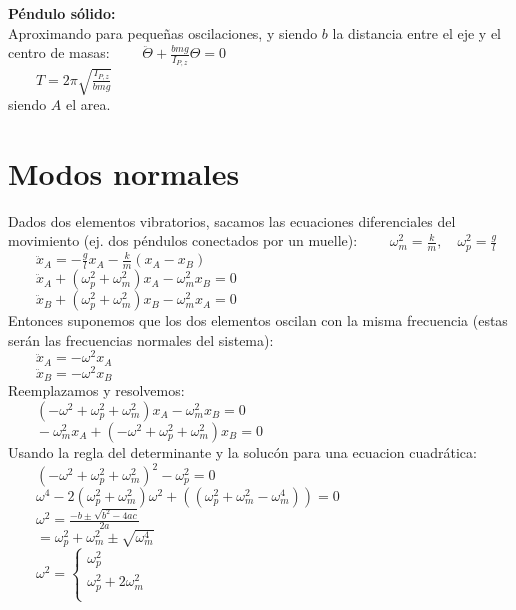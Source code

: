 \documentclass[a4paper,landscape,10pt]{cheatsheet}
\begin{document}
\textbf{Péndulo sólido:}\\
Aproximando para pequeñas oscilaciones, y siendo $b$ la distancia entre el eje y el centro de masas:
$\qquad \ddot{\Theta} + \frac{bmg}{I_{P,z}}\Theta = 0$\\
$\qquad T=2\pi\sqrt{\frac{I_{P,z}}{bmg}}$\\
siendo $A$ el area.


\section{Modos normales}
Dados dos elementos vibratorios, sacamos las ecuaciones diferenciales del movimiento (ej. dos péndulos conectados por un muelle):
$\qquad \omega_m^2=\frac{k}{m},\quad\omega_p^2=\frac{g}{l}$\\
$\qquad \ddot{x}_A=-\frac{g}{l}x_A-\frac{k}{m}(x_A-x_B)$\\
$\qquad \ddot{x}_A+(\omega_p^2+\omega_m^2)x_A-\omega_m^2x_B=0$\\
$\qquad \ddot{x}_B+(\omega_p^2+\omega_m^2)x_B-\omega_m^2x_A=0$\\
Entonces suponemos que los dos elementos oscilan con la misma
frecuencia (estas serán las frecuencias normales del sistema):\\
$\qquad\ddot{x}_A=-\omega^2 x_A$\\
$\qquad\ddot{x}_B=-\omega^2 x_B$\\
Reemplazamos y resolvemos:\\
$\qquad (-\omega^2+\omega_p^2+\omega_m^2)x_A-\omega_m^2x_B=0$\\
$\qquad -\omega_m^2x_A+(-\omega^2+\omega_p^2+\omega_m^2)x_B=0$\\
Usando la regla del determinante y la solucón para una ecuacion cuadrática:\\
$\qquad (-\omega^2+\omega_p^2+\omega_m^2)^2 - \omega_p^2=0$\\
$\qquad \omega^4-2(\omega_p^2+\omega_m^2)\omega^2 + ((\omega_p^2+\omega_m^2-\omega_m^4))=0$\\
$\qquad \omega^2=\frac{-b \pm \sqrt{b^2 - 4ac}}{2a}$\\
$\qquad =\omega_p^2+\omega_m^2 \pm \sqrt{\omega_m^4}$\\
$\qquad \omega^2=
  \begin{cases}
    \omega_p^2             \\
    \omega_p^2+2\omega_m^2 \\
  \end{cases}
$
\end{document}
